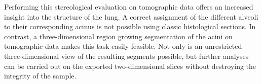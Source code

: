Performing this stereological evaluation on tomographic data offers an increased insight into the structure of the lung. A correct assignment of the different alveoli to their corresponding acinus is not possible using   classic histological sections. In contrast, a three-dimensional region growing segmentation of the acini on tomographic data makes this task easily feasible. Not only is an unrestricted three-dimensional view of the resulting segments possible, but further analyses can be carried out on the exported two-dimensional slices without destroying the integrity of the sample.

